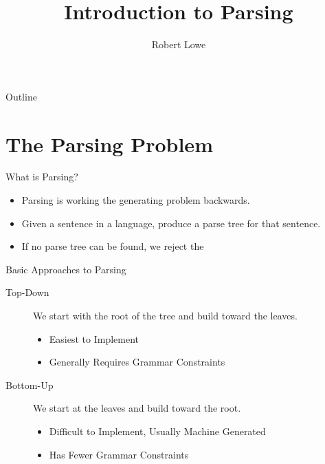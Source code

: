 \documentclass[handout]{beamer}
\title{Introduction to Parsing}
\author{Robert Lowe}
\institute[Southeast Missouri State University] %
{
  Department of Computer Science\\
  Southeast Missouri State University
}
\date[]{}
\begin{document}
\begin{frame}
  \titlepage
\end{frame}

\begin{frame}{Outline}
  \tableofcontents
\end{frame}




\section{The Parsing Problem}
\begin{frame}{What is Parsing?}
    \begin{itemize}
        \item Parsing is working the generating problem backwards.
        \item Given a sentence in a language, produce a parse tree for that sentence.
        \item If no parse tree can be found, we reject the 
    \end{itemize}
\end{frame}

\begin{frame}{Basic Approaches to Parsing}
    \begin{description}
        \item[Top-Down] We start with the root of the tree and build toward the leaves.
        \begin{itemize}
            \item Easiest to Implement
            \item Generally Requires Grammar Constraints
        \end{itemize}
        \item[Bottom-Up] We start at the leaves and build toward the root.
        \begin{itemize}
            \item Difficult to Implement, Usually Machine Generated
            \item Has Fewer Grammar Constraints
        \end{itemize}
    \end{description}
\end{frame}
\end{document}
